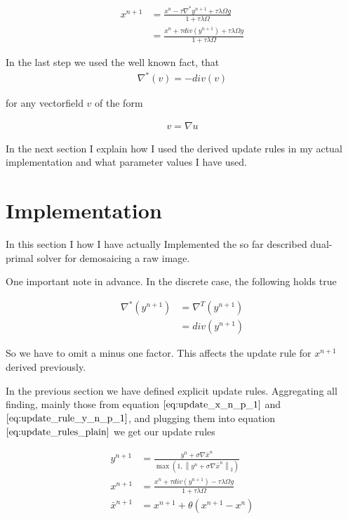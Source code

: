 \documentclass{paper}
\newcommand{\twonorm}[1]{\left\lVert#1\right\rVert_2}
\begin{document}
\begin{align}
	x^{n+1} 
	&= \frac{x^n - \tau \nabla^* y^{n+1} +  \tau \lambda \Omega g}{1+\tau \lambda \Omega} \nonumber \\
	&= \frac{x^n + \tau div(y^{n+1}) +  \tau \lambda \Omega g}{1+\tau \lambda \Omega}
\label{eq:update_x_n_p_1}	
\end{align}

In the last step we used the well known fact, that 
\begin{align}
	\nabla^* (v) = -div(v)
\end{align}

for any vectorfield $v$ of the form 

\begin{align}
	v = \nabla u
\end{align}

In the next section I explain how I used the derived update rules in my actual implementation and what parameter values I have used. 

\section{Implementation}

In this section I how I have actually Implemented the so far described dual-primal solver for demosaicing a raw image.

One important note in advance. In the discrete case, the following holds true 

\begin{align}
	\nabla^* (y^{n+1}) 
	&= \nabla^{T} (y^{n+1}) \nonumber \\
	&= div(y^{n+1})
\end{align}

So we have to omit a minus one factor. This affects the update rule for $x^{n+1}$ derived previously.

In the previous section we have defined explicit update rules. Aggregating all finding, mainly those from equation $\ref{eq:update_x_n_p_1}$ and $\ref{eq:update_rule_y_n_p_1}$, and plugging them into equation $\ref{eq:update_rules_plain}$ we get our update rules


\begin{align}
	y^{n+1} &= \frac{y^n + \sigma \nabla \bar{x}^{n}}{\max{\left(1,\twonorm{y^n + \sigma \nabla \bar{x}^{n}} \right)}} \nonumber \\
	x^{n+1} &= \frac{x^n + \tau div(y^{n+1}) -  \tau \lambda \Omega g}{1+\tau \lambda \Omega} \\
	\bar{x}^{n+1} &= x^{n+1} + \theta(x^{n+1} - x^n)
\label{eq:final_update_rules_plain}	
\end{align}
\end{document}
